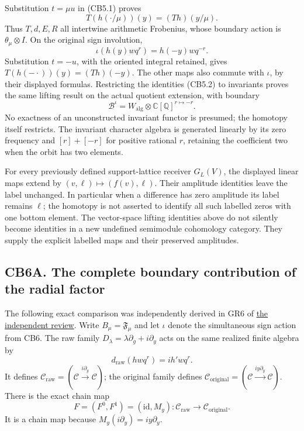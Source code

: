 Substitution \(t=\mu u\) in (CB5.1) proves \[
T(h(\cdot/\mu))(y)=(Th)(y/\mu).
\] Thus \(T,d,E,R\) all intertwine arithmetic Frobenius, whose boundary
action is \(\theta_\mu\otimes I\). On the original sign involution, \[
\iota(h(y)wq^r)=h(-y)wq^{-r}.
\] Substitution \(t=-u\), with the oriented integral retained, gives
\(T(h(-\cdot))(y)=(Th)(-y)\). The other maps also commute with
\(\iota\), by their displayed formulas. Restricting the identities
(CB5.2) to invariants proves the same lifting result on the actual
quotient extension, with boundary \[
\mathcal B^{\iota}
=W_{\mathrm{alg}}\otimes\mathbb C[\mathbb Q]^{r\mapsto-r}.
\tag{CB6.2}
\] No exactness of an unconstructed invariant functor is presumed; the
homotopy itself restricts. The invariant character algebra is generated
linearly by its zero frequency and \([r]+[-r]\) for positive rational
\(r\), retaining the coefficient two when the orbit has two elements.

For every previously defined support-lattice receiver \(G_L(V)\), the
displayed linear maps extend by \((v,\ell)\mapsto(f(v),\ell)\). Their
amplitude identities leave the label unchanged. In particular when a
difference has zero amplitude its label remains \(\ell\); the homotopy
is not asserted to identify all such labelled zeros with one bottom
element. The vector-space lifting identities above do not silently
become identities in a new undefined semimodule cohomology category.
They supply the explicit labelled maps and their preserved amplitudes.

\subsection{CB6A. The complete boundary contribution of the radial
factor}\label{cb6a.-the-complete-boundary-contribution-of-the-radial-factor}

The following exact comparison was independently derived in GR6 of
\href{https://github.com/KokunoYumeto/zeta-function-research-reader/blob/main/workbenches/splitzero-tandem/continuations/20260924-cohomology-weight-and-character-lifts/original-character-lifting/tau_lifting_weights_20260924/CLASSICAL_BOUNDARY_GRAPH_REVIEW.md}{the independent review}. Write
\(B_\mu=\mathfrak F_\mu\) and let \(\iota\) denote the simultaneous sign
action from CB6. The raw family
\(D_\lambda=\lambda\partial_g+i\partial_y\) acts on the same realized
finite algebra by \[
d_{\mathrm{raw}}(h wq^r)=ih'wq^r.
\] It defines
\(\mathcal C_{\mathrm{raw}}=(\mathcal C\xrightarrow{i\partial_y}\mathcal C)\);
the original family defines
\(\mathcal C_{\mathrm{original}}=(\mathcal C\xrightarrow{iy\partial_y}\mathcal C)\).
There is the exact chain map \[
F=(F^0,F^1)=(\mathrm{id},M_y):
\mathcal C_{\mathrm{raw}}\longrightarrow
\mathcal C_{\mathrm{original}}.
\tag{CB6A.1}
\] It is a chain map because \(M_y(i\partial_y)=iy\partial_y\).

